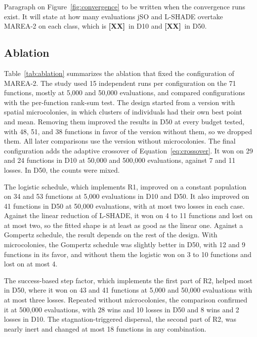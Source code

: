 \documentclass[preprint,12pt]{elsarticle}
\newcommand{\XX}{\textcolor{pending}{\textbf{[XX]}}}
\newcommand{\pend}[1]{\textcolor{pending}{#1}}
\newcommand{\XX}{[XX]}
\newcommand{\pend}[1]{#1}
\begin{document}
\pend{Paragraph on Figure~\ref{fig:convergence} to be written when the
convergence runs exist. It will state at how many evaluations jSO and L-SHADE
overtake MAREA-2 on each class, which is \XX\ in D10 and \XX\ in D50.}

\subsection{Ablation}
\label{sec:ablation}

Table~\ref{tab:ablation} summarizes the ablation that fixed the configuration
of MAREA-2. The study used 15 independent runs per configuration on the 71
functions, mostly at 5,000 and 50,000 evaluations, and compared configurations
with the per-function rank-sum test. The design started from a version with
spatial microcolonies, in which clusters of individuals had their own best
point and mean. Removing them improved the results in D50 at every budget
tested, with 48, 51, and 38 functions in favor of the version without them, so
we dropped them. All later comparisons use the version without microcolonies.
The final configuration adds the adaptive crossover of
Equation~\eqref{eq:crossover}. It won on 29 and 24 functions in D10 at 50,000 and 500,000 evaluations,
against 7 and 11 losses. In D50, the counts were mixed.



The logistic schedule, which implements R1, improved on a constant population
on 34 and 53 functions at 5,000 evaluations in D10 and D50. It also improved
on 41 functions in D50 at 50,000 evaluations, with at most two losses in each
case.
Against the linear reduction of L-SHADE, it won on 4 to 11 functions and lost
on at most two, so the fitted shape is at least as good as the linear one.
Against a Gompertz schedule, the result depends on the rest of the design. With
microcolonies, the Gompertz schedule was slightly better in D50, with 12 and 9
functions in its favor, and without them the logistic won on 3 to 10 functions
and lost on at most 4.

The success-based step factor, which implements the first part of R2, helped
most in D50, where it won on 43 and 41 functions at 5,000 and 50,000
evaluations with at most three losses. Repeated without microcolonies, the
comparison confirmed it at 500,000 evaluations, with 28 wins and 10 losses in
D50 and 8 wins and 2 losses in D10. The stagnation-triggered dispersal, the
second part of R2, was nearly inert and changed at most 18 functions in any
combination.
\end{document}
